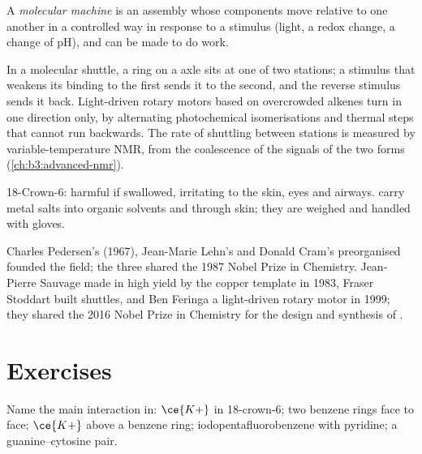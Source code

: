 \begin{definition}\label{def:b3:supramolecular:machine}
A \emph{molecular machine} is an assembly whose
components move relative to one another in a controlled way in response to a
stimulus (light, a redox change, a change of pH), and can be made to do work.
\end{definition}

In a molecular shuttle, a ring on a  axle sits at one of two stations; a
stimulus that weakens its binding to the first sends it to the second, and the
reverse stimulus sends it back. Light-driven rotary motors based on
overcrowded alkenes turn in one direction only, by alternating photochemical
isomerisations and thermal steps that cannot run backwards. The rate of
shuttling between stations is measured by variable-temperature NMR, from the
coalescence of the signals of the two forms (\cref{ch:b3:advanced-nmr}).

\begin{safety}{}
18-Crown-6: harmful if swallowed, irritating to the skin, eyes and airways.
 carry metal salts into organic solvents and through skin; they are
weighed and handled with gloves.
\end{safety}

\begin{history}
Charles Pedersen's  (1967), Jean-Marie Lehn's  and Donald
Cram's preorganised  founded the field; the three shared the 1987 Nobel
Prize in Chemistry. Jean-Pierre Sauvage made  in high yield by the
copper template in 1983, Fraser Stoddart built  shuttles, and Ben
Feringa a light-driven rotary motor in 1999; they shared the 2016 Nobel Prize in
Chemistry for the design and synthesis of .
\end{history}

\section{Exercises}

\begin{exercise}[$\star$]\label{exo:b3:supramolecular:1}
Name the main interaction in: $\ce{K+}$ in 18-crown-6; two benzene rings face to face;
$\ce{K+}$ above a benzene ring; iodopentafluorobenzene with pyridine; a guanine--cytosine
pair.
\end{exercise}

